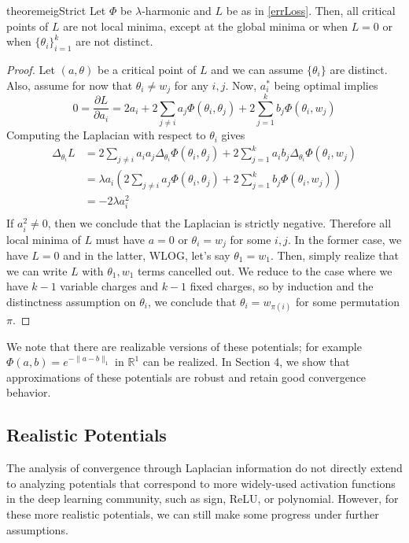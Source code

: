 \documentclass{article}
\newcommand{\R}{{\mathbb{R}}}
\newcommand{\pd}[2]{\frac{\partial#1}{\partial#2}}
\begin{document}
\begin{restatable}{theorem}{eigStrict}
\label{EigStrict}
Let $\Phi$ be $\lambda$-harmonic and $L$ be as in \ref{errLoss}. Then, all critical points of $L$ are not local minima, except at the global minima or when $L =  0$ or when $\{\theta_i \}_{i=1}^k$ are not distinct.
\end{restatable}
\begin{proof}
Let $(a,\theta)$ be a critical point of $L$ and we can assume $\{\theta_i \}$ are distinct. Also, assume for now that $\theta_i \neq w_j$ for any $i,j$. Now, $a_i^*$ being optimal implies
\[0 = \pd{L}{a_i} = 2a_i  + 2\sum_{j\neq i} a_j \Phi(\theta_i,\theta_j) + 2\sum_{j=1}^k b_j \Phi(\theta_i,w_j)\]
Computing the Laplacian with respect to $\theta_i$ gives
\begin{align*}
\Delta_{\theta_i}L &= 2\sum_{j\neq i} a_i a_j \Delta_{\theta_i}\Phi(\theta_i,\theta_j) + 2\sum_{j=1}^k a_i b_j \Delta_{\theta_i}\Phi(\theta_i,w_j) \\
&= \lambda a_i\left(2\sum_{j\neq i} a_j \Phi(\theta_i,\theta_j) + 2\sum_{j=1}^k  b_j \Phi(\theta_i,w_j)\right) \\
&= -2\lambda a_i^2\\
\end{align*}
If $a_i^2 \neq 0$, then we conclude that the Laplacian is strictly negative. Therefore all local minima of $L$ must have $a = 0$ or $\theta_i = w_j$ for some $i, j$. In the former case, we have $L = 0$ and in the latter, WLOG, let's say $\theta_1 = w_1$. Then, simply realize that we can write $L$ with $\theta_1,w_1$ terms cancelled out. We reduce to the case where we have $k-1$ variable charges and $k-1$ fixed charges, so by induction and the distinctness assumption on $\theta_i$, we conclude that $\theta_i = w_{\pi(i)}$ for some permutation $\pi$.
\end{proof}

We note that there are realizable versions of these potentials; for example $\Phi(a,b) = e^{-\|a-b\|_1}$ in $\R^1$ can be realized. In Section 4, we show that approximations of these potentials are robust and retain good convergence behavior. 

\subsection{Realistic Potentials}

The analysis of convergence through Laplacian information do not directly extend to analyzing potentials that correspond to more widely-used activation functions in the deep learning community, such as sign, ReLU, or polynomial. However, for these more realistic potentials, we can still make some progress under further assumptions. 
\end{document}
